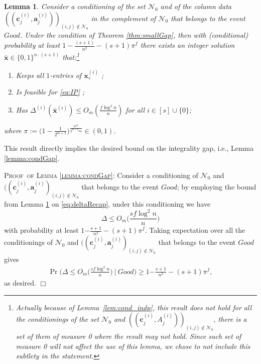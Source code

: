 \documentclass{article}
\newcommand{\cN}{\mathcal{N}}
\newcommand{\av}[0]{\mathbf{a}}
\newcommand{\cv}[0]{\mathbf{c}}
\newcommand{\xv}[0]{\mathbf{x}}
\newcommand{\colij}{\av^{(i)}_j}
\newtheorem{lemma}{Lemma}[section]
\newenvironment{proof}[1][]
   {\textsc{Proof#1: }}
   {\hfill$\Box$\smallskip}
\begin{document}
\begin{lemma} \label{lemma:mainDeltai}
Consider a conditioning of the set $\mathcal{N}_0$ and of the column data
$((\cv^{(i)}_j, \colij))_{(i,j) \notin \cN_0}$ in the complement of $\cN_0$ that belongs to the event $Good$. Under the condition of Theorem \ref{thm:smallGap},
then with (conditional) probability at least $1 - {\frac{(s+1)}{n^2}-(s+1) \pi^f}$ there exists an integer solution $\bar{\xv} \in \{0,1\}^{n \cdot (s+1)}$ that:\footnote{Actually because of Lemma~\ref{lem:cond_indp}, this result does not hold for all the conditionings of the set $\mathcal{N}_0$ and $((\cv^{(i)}_j, A^{(i)}_j))_{(i,j) \notin \cN_0}$, there is a set of them of measure 0 where the result may not hold. Since such set of measure 0 will not affect the use of this lemma, we chose to not include this subtlety in the statement.} 
\vspace{-8pt}
\begin{enumerate}
    \item Keeps all $1$-entries of $\xv^{(i)}_{\diamond}$ ;\vspace{-2pt}
    \item Is feasible for \eqref{eq:IP} \vspace{-4pt};
    \item Has $\Delta^{(i)}(\bar{\xv}^{(i)}) \leq O_m(\frac{{f}\log^2 n}{n})$ for all $i \in [s] \cup \{0\}$;
\end{enumerate} 
{where $\pi :=  \big(1 - \frac{1}{2^{m+2}}\big)^{\frac{\alpha^m}{2^{m+6}m}} \in (0,1)$.}
\end{lemma}

This result directly implies the desired bound on the integrality gap, i.e., Lemma \ref{lemma:condGap}.

\begin{proof}[~of Lemma \ref{lemma:condGap}]
    Consider a conditioning of $\mathcal{N}_0$ and $((\cv^{(i)}_j, \colij)_{(i,j) \notin \cN_0}$ that belongs to the event $Good$; by employing the bound from Lemma \ref{lemma:mainDeltai} on \eqref{eq:deltaRecap}, under this conditioning we have $$\Delta \le  O_m\bigg(\frac{{sf}\log^2 n}{n}\bigg)$$ with probability at least $1 {- \frac{s+1}{n^2}-(s+1)\pi^f}
    $. Taking expectation over all the conditionings of $\mathcal{N}_0$ and $((\cv^{(i)}_j, \colij)_{(i,j) \notin \cN_0}$ that belongs to the event $Good$ gives
    \begin{align*}
        \Pr\bigg(\Delta \le O_m\bigg(\frac{{sf}\log^2 n}{n}\bigg) ~\bigg|~ Good \bigg) \ge 1 {- \frac{s+1}{n^2}-(s+1)\pi^f}
    ,
    \end{align*}
    as desired.
\end{proof}
\end{document}
